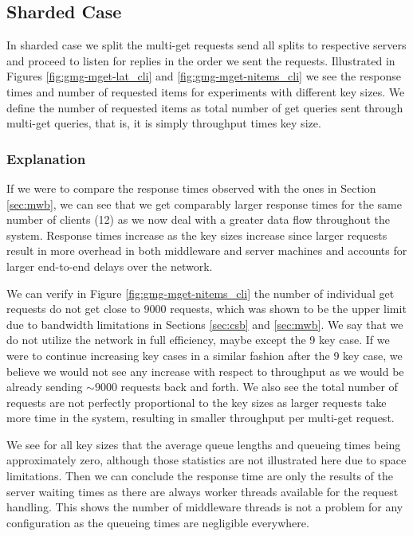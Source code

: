 \documentclass[11pt,a4paper]{article}
\begin{document}
\subsection{Sharded Case} \label{sec:gmg-true}
In sharded case we split the multi-get requests send all splits to respective servers and proceed to listen for replies in the order we sent the requests. Illustrated in Figures \ref{fig:gmg-mget-lat_cli} and \ref{fig:gmg-mget-nitems_cli} we see the response times and number of requested items for experiments with different key sizes. We define the number of requested items as total number of get queries sent through multi-get queries, that is, it is simply throughput times key size.

\subsubsection{Explanation} \label{sec:gmg-true-exp}
\par If we were to compare the response times observed with the ones in Section \ref{sec:mwb}, we can see that we get comparably larger response times for the same number of clients (12) as we now deal with a greater data flow throughout the system. Response times increase as the key sizes increase since larger requests result in more overhead in both middleware and server machines and accounts for larger end-to-end delays over the network.
\par We can verify in Figure \ref{fig:gmg-mget-nitems_cli} the number of individual get requests do not get close to 9000 requests, which was shown to be the upper limit due to bandwidth limitations in Sections \ref{sec:csb} and \ref{sec:mwb}. We say that we do not utilize the network in full efficiency, maybe except the 9 key case. If we were to continue increasing key cases in a similar fashion after the 9 key case, we believe we would not see any increase with respect to throughput as we would be already sending $\sim 9000$ requests back and forth. We also see the total number of requests are not perfectly  proportional to the key sizes as larger requests take more time in the system, resulting in smaller throughput per multi-get request.
\par We see for all key sizes that the average queue lengths and queueing times being approximately zero, although those statistics are not illustrated here due to space limitations. Then we can conclude the response time are only the results of the server waiting times as there are always worker threads available for the request handling. This shows the number of middleware threads is not a problem for any configuration as the queueing times are negligible everywhere.
\end{document}
